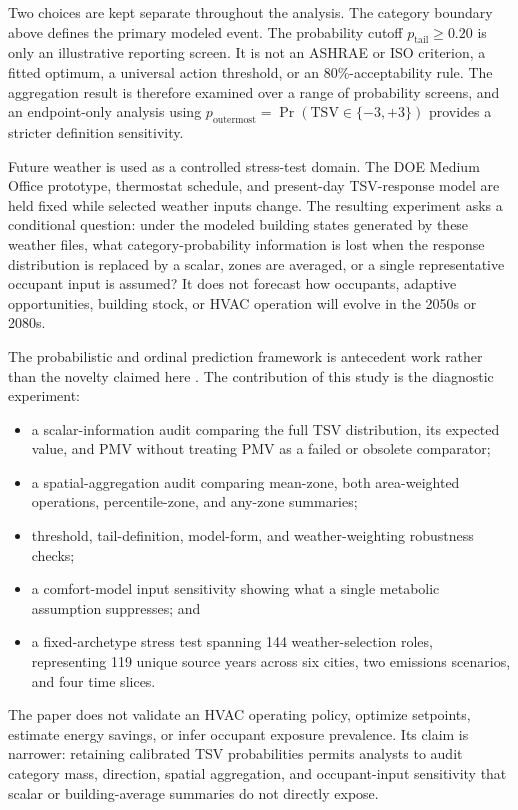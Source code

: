 Two choices are kept separate throughout the analysis. The category boundary above defines the primary modeled event. The probability cutoff $p_{\mathrm{tail}}\ge0.20$ is only an illustrative reporting screen. It is not an ASHRAE or ISO criterion, a fitted optimum, a universal action threshold, or an 80\%-acceptability rule. The aggregation result is therefore examined over a range of probability screens, and an endpoint-only analysis using $p_{\mathrm{outermost}}=\Pr(\mathrm{TSV}\in\{-3,+3\})$ provides a stricter definition sensitivity.

Future weather is used as a controlled stress-test domain. The DOE Medium Office prototype, thermostat schedule, and present-day TSV-response model are held fixed while selected weather inputs change. The resulting experiment asks a conditional question: under the modeled building states generated by these weather files, what category-probability information is lost when the response distribution is replaced by a scalar, zones are averaged, or a single representative occupant input is assumed? It does not forecast how occupants, adaptive opportunities, building stock, or HVAC operation will evolve in the 2050s or 2080s.

The probabilistic and ordinal prediction framework is antecedent work rather than the novelty claimed here \citep{guo2026seven}. The contribution of this study is the diagnostic experiment:
\begin{itemize}
    \item a scalar-information audit comparing the full TSV distribution, its expected value, and PMV without treating PMV as a failed or obsolete comparator;
    \item a spatial-aggregation audit comparing mean-zone, both area-weighted operations, percentile-zone, and any-zone summaries;
    \item threshold, tail-definition, model-form, and weather-weighting robustness checks;
    \item a comfort-model input sensitivity showing what a single metabolic assumption suppresses; and
    \item a fixed-archetype stress test spanning 144 weather-selection roles, representing 119 unique source years across six cities, two emissions scenarios, and four time slices.
\end{itemize}

The paper does not validate an HVAC operating policy, optimize setpoints, estimate energy savings, or infer occupant exposure prevalence. Its claim is narrower: retaining calibrated TSV probabilities permits analysts to audit category mass, direction, spatial aggregation, and occupant-input sensitivity that scalar or building-average summaries do not directly expose.
